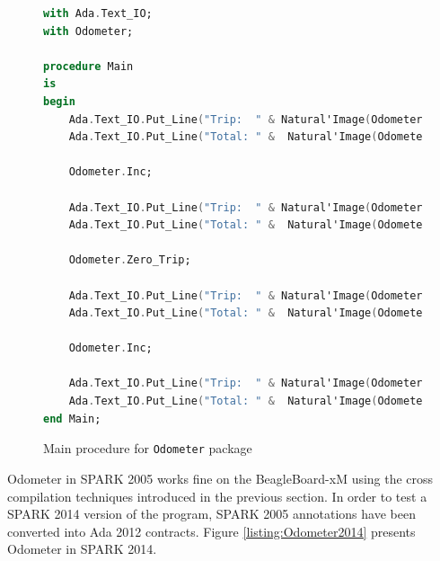 \begin{figure}[ht]
\singlespacing
\begin{lstlisting}[language=ada, frame=single, gobble=0]
with Ada.Text_IO;
with Odometer;

procedure Main
is
begin
    Ada.Text_IO.Put_Line("Trip:  " & Natural'Image(Odometer.Read_Trip));
    Ada.Text_IO.Put_Line("Total: " &  Natural'Image(Odometer.Read_Total));

    Odometer.Inc;

    Ada.Text_IO.Put_Line("Trip:  " & Natural'Image(Odometer.Read_Trip));
    Ada.Text_IO.Put_Line("Total: " &  Natural'Image(Odometer.Read_Total));

    Odometer.Zero_Trip;

    Ada.Text_IO.Put_Line("Trip:  " & Natural'Image(Odometer.Read_Trip));
    Ada.Text_IO.Put_Line("Total: " &  Natural'Image(Odometer.Read_Total));

    Odometer.Inc;

    Ada.Text_IO.Put_Line("Trip:  " & Natural'Image(Odometer.Read_Trip));
    Ada.Text_IO.Put_Line("Total: " &  Natural'Image(Odometer.Read_Total));
end Main;
\end{lstlisting} 
\doublespacing
\caption{Main procedure for \lstinline{Odometer} package}
\label{listing:main}
\end{figure}

Odometer in SPARK 2005 works fine on the BeagleBoard-xM using the cross compilation techniques introduced in the previous section. In order to test a SPARK 2014 version of the program, SPARK 2005 annotations have been converted into Ada 2012 contracts. Figure \ref{listing:Odometer2014} presents Odometer in SPARK 2014.

